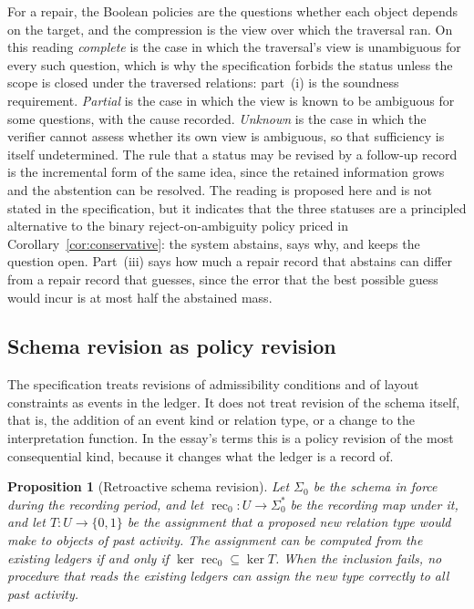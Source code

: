 \documentclass[11pt]{article}
\newtheorem{proposition}{Proposition}
\theoremstyle{definition}
\theoremstyle{remark}
\newcommand{\Bool}{\{0,1\}}
\begin{document}
For a repair, the Boolean policies are the questions whether each object depends on the target, and the compression is the view over which the traversal ran. On this reading \emph{complete} is the case in which the traversal's view is unambiguous for every such question, which is why the specification forbids the status unless the scope is closed under the traversed relations: part~(i) is the soundness requirement. \emph{Partial} is the case in which the view is known to be ambiguous for some questions, with the cause recorded. \emph{Unknown} is the case in which the verifier cannot assess whether its own view is ambiguous, so that sufficiency is itself undetermined. The rule that a status may be revised by a follow-up record is the incremental form of the same idea, since the retained information grows and the abstention can be resolved. The reading is proposed here and is not stated in the specification, but it indicates that the three statuses are a principled alternative to the binary reject-on-ambiguity policy priced in Corollary~\ref{cor:conservative}: the system abstains, says why, and keeps the question open. Part~(iii) says how much a repair record that abstains can differ from a repair record that guesses, since the error that the best possible guess would incur is at most half the abstained mass.

\subsection{Schema revision as policy revision}

The specification treats revisions of admissibility conditions and of layout constraints as events in the ledger. It does not treat revision of the schema itself, that is, the addition of an event kind or relation type, or a change to the interpretation function. In the essay's terms this is a policy revision of the most consequential kind, because it changes what the ledger is a record of.

\begin{proposition}[Retroactive schema revision]\label{prop:schema}
Let $\Sigma_0$ be the schema in force during the recording period, and let $\operatorname{rec}_0:U\to\Sigma_0^{*}$ be the recording map under it, and let $T:U\to\Bool$ be the assignment that a proposed new relation type would make to objects of past activity. The assignment can be computed from the existing ledgers if and only if $\ker\operatorname{rec}_0\subseteq\ker T$. When the inclusion fails, no procedure that reads the existing ledgers can assign the new type correctly to all past activity.
\end{proposition}
\end{document}
